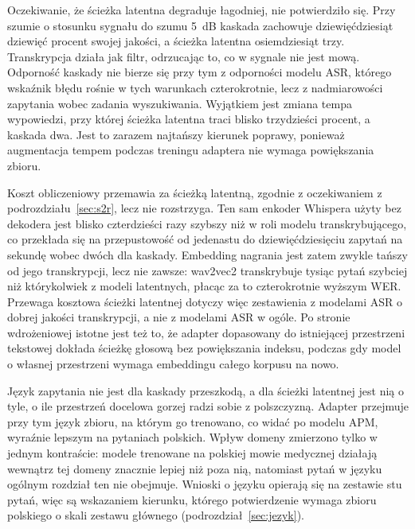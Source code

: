 Oczekiwanie, że ścieżka latentna degraduje łagodniej, nie potwierdziło się. Przy szumie o stosunku
sygnału do szumu 5~dB kaskada zachowuje dziewięćdziesiąt dziewięć procent swojej jakości, a ścieżka
latentna osiemdziesiąt trzy. Transkrypcja działa jak filtr, odrzucając to, co w sygnale nie jest
mową. Odporność kaskady nie bierze się przy tym z odporności modelu ASR, którego wskaźnik błędu
rośnie w tych warunkach czterokrotnie, lecz z nadmiarowości zapytania wobec zadania wyszukiwania.
Wyjątkiem jest zmiana tempa wypowiedzi, przy której ścieżka latentna traci blisko trzydzieści
procent, a kaskada dwa. Jest to zarazem najtańszy kierunek poprawy, ponieważ augmentacja tempem
podczas treningu adaptera nie wymaga powiększania zbioru.

Koszt obliczeniowy przemawia za ścieżką latentną, zgodnie z oczekiwaniem z podrozdziału~\ref{sec:s2r},
lecz nie rozstrzyga. Ten sam enkoder Whispera użyty bez dekodera jest blisko czterdzieści razy
szybszy niż w roli modelu transkrybującego, co przekłada się na przepustowość od jedenastu do
dziewięćdziesięciu zapytań na sekundę wobec dwóch dla kaskady. Embedding nagrania jest zatem
zwykle tańszy od jego transkrypcji, lecz nie zawsze: wav2vec2 transkrybuje tysiąc pytań szybciej
niż którykolwiek z modeli latentnych, płacąc za to czterokrotnie wyższym WER. Przewaga kosztowa
ścieżki latentnej dotyczy więc zestawienia z modelami ASR o dobrej jakości transkrypcji, a nie
z modelami ASR w ogóle. Po stronie wdrożeniowej istotne jest też to, że adapter dopasowany do
istniejącej przestrzeni tekstowej dokłada ścieżkę głosową bez powiększania indeksu, podczas gdy
model o własnej przestrzeni wymaga embeddingu całego korpusu na nowo.

Język zapytania nie jest dla kaskady przeszkodą, a dla ścieżki latentnej jest nią o tyle, o ile
przestrzeń docelowa gorzej radzi sobie z polszczyzną. Adapter przejmuje przy tym język zbioru, na
którym go trenowano, co widać po modelu APM, wyraźnie lepszym na pytaniach polskich. Wpływ domeny
zmierzono tylko w jednym kontraście: modele trenowane na polskiej mowie medycznej działają
wewnątrz tej domeny znacznie lepiej niż poza nią, natomiast pytań w języku ogólnym rozdział ten
nie obejmuje. Wnioski o języku opierają się na zestawie stu pytań, więc są wskazaniem kierunku,
którego potwierdzenie wymaga zbioru polskiego o skali zestawu głównego
(podrozdział~\ref{sec:jezyk}).

